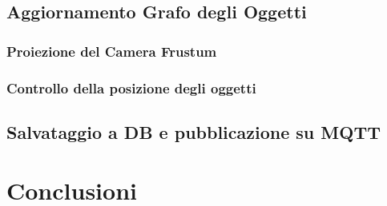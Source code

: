 \subsection{Aggiornamento Grafo degli Oggetti}
\subsubsection{Proiezione del Camera Frustum}
\subsubsection{Controllo della posizione degli oggetti}
\subsection{Salvataggio a DB e pubblicazione su MQTT}



\section{Conclusioni}

